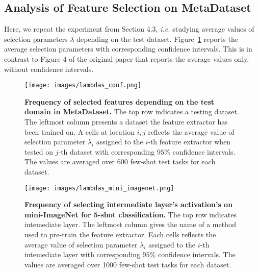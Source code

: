 \documentclass[runningheads]{llncs}
\begin{document}
\subsection{Analysis of Feature Selection on MetaDataset}
Here, we repeat the experiment from Section 4.3, \textit{i.e.} studying average values of
selection parameters $\lambda$ depending on the test dataset.
Figure~\ref{fig:lambdas_conf} reports the average selection parameters with
corresponding confidence intervals. This is in contrast to Figure 4 of the
original paper that reports the average values only, without confidence intervals.

\begin{figure}[t!]
\begin{center}
  \texttt{[image: images/lambdas\_conf.png]}
\end{center}
\caption{\textbf{Frequency of selected features depending on the test domain in MetaDataset.}
  The top row indicates a testing dataset. The leftmost column presents a dataset the
  feature extractor has been trained on. A cells at location $i, j$ reflects
  the average value of selection parameter $\lambda_i$ assigned to the $i$-th feature
  extractor when tested on $j$-th dataset with corresponding $95\%$ confidence
  intervals. The values are averaged over 600 few-shot test tasks for each
  dataset.}
\label{fig:lambdas_conf}
\end{figure}

\begin{figure}[t!]
\begin{center}
  \texttt{[image: images/lambdas\_mini\_imagenet.png]}
\end{center}
\caption{\textbf{Frequency of selecting intermediate layer's activation's on
    mini-ImageNet for 5-shot classification.}
  The top row indicates intemediate layer. The leftmost column gives the name of
  a method used to pre-train the feature extractor. Each cells reflects
  the average value of selection parameter $\lambda_i$ assigned to the $i$-th
  intemediate layer with corresponding $95\%$ confidence intervals. The values
  are averaged over 1000 few-shot test tasks for each dataset.}
\label{fig:lambdas_mini_imagenet}
\end{figure}
\end{document}
